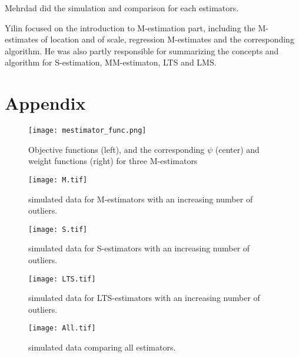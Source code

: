 \documentclass[conference]{IEEEtran}
\begin{document}
Mehrdad did the simulation and comparison for each estimators.

Yilin focused on the introduction to M-estimation part, including the M-estimates of location and of scale, regression M-estimates and the corresponding algorithm. He was also partly responsible for summarizing the concepts and algorithm for S-estimation, MM-estimaton, LTS and LMS.  

\bibitem{}
\section{Appendix}
\begin{figure}[h]
\centering
\texttt{[image: mestimator\_func.png]}
\caption{Objective functions (left), and the corresponding $\psi$ (center) and weight functions (right) for three M-estimators}
\end{figure}
\centering
\clearpage
\begin{figure}[t!]
\caption{simulated data for M-estimators with an increasing number of outliers.}
\texttt{[image: M.tif]}
\end{figure}
\centering
\begin{figure}[b!]
\caption{simulated data for S-estimators with an increasing number of outliers.}
\texttt{[image: S.tif]}
\end{figure}

\newpage
\clearpage
\begin{figure}[t!]
\caption{simulated data for LTS-estimators with an increasing number of outliers.}
\texttt{[image: LTS.tif]}
\end{figure}

\begin{figure}[b!]
\caption{simulated data comparing all estimators.}
\texttt{[image: All.tif]}
\end{figure}

{\small


}
\end{document}
